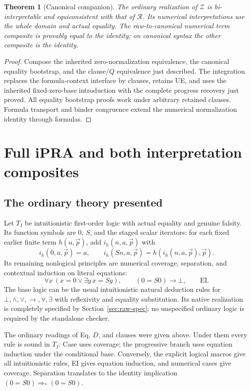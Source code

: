 \documentclass[11pt]{article}
\newtheorem{theorem}{Theorem}[section]
\theoremstyle{definition}
\newcommand{\Raw}{\mathcal R}
\newcommand{\Can}{\mathcal Z}
\begin{document}
\begin{theorem}[Canonical companion]
The ordinary realization of $\Can$ is bi-interpretable and equiconsistent
with that of $\Raw$. Its numerical interpretations use the whole domain
and actual equality. The raw-to-canonical numerical term composite is
provably equal to the identity; on canonical syntax the other composite
is the identity.
\end{theorem}
\begin{proof}
Compose the inherited zero-normalization equivalence, the canonical
equality bootstrap, and the clause/$Q$ equivalence just described.
The integration replaces the formula-context interface by clauses, retains
UE, and uses the inherited fixed-zero-base introduction with the complete
progress recovery just proved. All equality bootstrap proofs work under
arbitrary retained clauses. Formula transport and binder congruence extend
the numerical normalization identity through formulas.
\end{proof}


\section{Full iPRA and both interpretation composites}
\label{sec:interpretations}

\subsection{The ordinary theory presented}

Let $T_I$ be intuitionistic first-order logic with actual equality and
genuine falsity. Its function symbols are $0$, $S$, and the staged scalar
iterators: for each fixed earlier finite term $h(u,\vec p)$, add
$i_h(n,a,\vec p)$ with
\[
 i_h(0,a,\vec p)=a,\qquad
 i_h(Sn,a,\vec p)=h(i_h(n,a,\vec p),\vec p).
\]
Its remaining nonlogical principles are numerical coverage,
separation, and contextual induction on literal equations:
\[
 \forall x\,(x=0\lor\exists y\,x=Sy),\qquad
 (0=S0)\to\bot,\qquad\text{EI}.
\]
The base logic can be the usual intuitionistic natural deduction rules
for $\bot,\wedge,\vee,\to,\forall,\exists$ with reflexivity and equality
substitution. Its native realization is completely specified by
Section~\ref{sec:raw-spec}; no unspecified ordinary logic is required by
the standalone checker.

The ordinary readings of Eq, $D$, and clauses were given above. Under them
every rule is sound in $T_I$: Case uses coverage; the progressive branch
uses equation induction under the conditional base. Conversely, the
explicit logical macros give all intuitionistic rules, EI gives equation
induction, and numerical cases give coverage. Separation translates to
the identity implication $(0=S0)\Rightarrow_*(0=S0)$.
\end{document}
